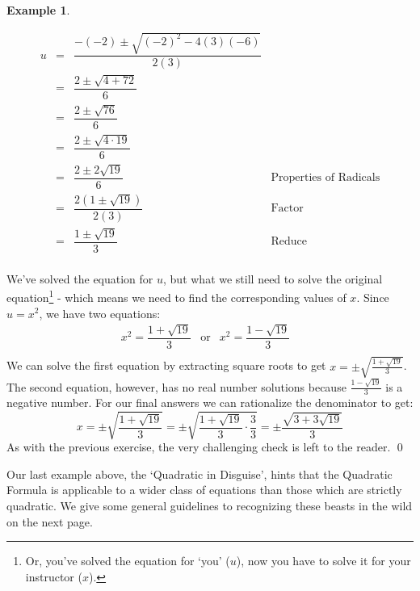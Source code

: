 \documentclass[11pt]{article}
\theoremstyle{definition}  %
\newtheorem{ex}{\bf Example}
\begin{document}
\begin{ex}
\begin{enumerate}
\[\begin{array}{rclr}
u & = & \dfrac{-(-2) \pm \sqrt{(-2)^2 - 4(3)(-6)}}{2(3)} & \\ [10pt]

& = & \dfrac{2 \pm \sqrt{4 + 72}}{6} & \\ [10pt]

& = & \dfrac{2 \pm \sqrt{76}}{6} & \\ [10pt]

& = & \dfrac{2 \pm \sqrt{4 \cdot 19}}{6} & \\ [10pt]

& = & \dfrac{2 \pm 2\sqrt{19}}{6} & \text{Properties of Radicals} \\ [10pt]

& = & \dfrac{2(1 \pm \sqrt{19})}{2(3)} & \text{Factor} \\ [10pt]

& = & \dfrac{1 \pm \sqrt{19}}{3} & \text{Reduce} \\

\end{array} \]

We've solved the equation for $u$, but what we still need to solve the original equation\footnote{Or, you've solved the equation for `you' ($u$), now you have to solve it for your instructor ($x$).} - which means we need to find the corresponding values of $x$.  Since $u = x^2$, we have two equations:\[ \begin{array}{rclr}  

x^2  =\dfrac{1 + \sqrt{19}}{3} & \text{or} & x^2  =\dfrac{1 - \sqrt{19}}{3} & \\

\end{array}\] We can solve the first equation by extracting square roots to get  $x = \pm \sqrt{\frac{1 + \sqrt{19}}{3}}$.  The second equation, however, has no real number solutions because $\frac{1 - \sqrt{19}}{3}$ is a negative number.  For our final answers we can rationalize the denominator to get: \[ x = \pm \sqrt{\dfrac{1 + \sqrt{19}}{3}} = \pm \sqrt{\dfrac{1 + \sqrt{19}}{3} \cdot \dfrac{3}{3}} = \pm \dfrac{\sqrt{3 + 3\sqrt{19}}}{3} \] As with the previous exercise, the very challenging check is left to the reader. \qed

\end{enumerate}

\end{ex}

Our last example above, the `Quadratic in Disguise', hints that the Quadratic Formula is applicable to a wider class of equations than those which are strictly quadratic.  We give some general guidelines to recognizing these beasts in the wild on the next page.
\end{document}
